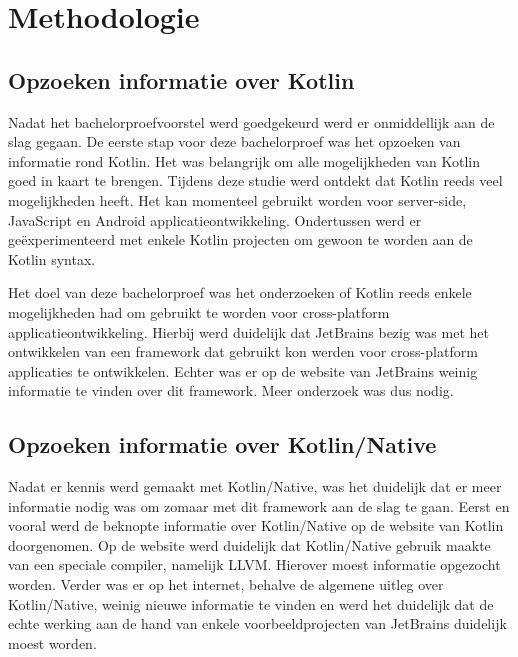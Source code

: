 
\chapter{Methodologie}
\label{ch:methodologie}


\section{Opzoeken informatie over Kotlin}
Nadat het bachelorproefvoorstel werd goedgekeurd werd er onmiddellijk aan de slag gegaan. De eerste stap voor deze bachelorproef was het opzoeken van informatie rond Kotlin. Het was belangrijk om alle mogelijkheden van Kotlin goed in kaart te brengen. Tijdens deze studie werd ontdekt dat Kotlin reeds veel mogelijkheden heeft. Het kan momenteel gebruikt worden voor server-side, JavaScript en Android applicatieontwikkeling. Ondertussen werd er geëxperimenteerd met enkele Kotlin projecten om gewoon te worden aan de Kotlin syntax.

Het doel van deze bachelorproef was het onderzoeken of Kotlin reeds enkele mogelijkheden had om gebruikt te worden voor cross-platform applicatieontwikkeling. Hierbij werd duidelijk dat JetBrains bezig was met het ontwikkelen van een framework dat gebruikt kon werden voor cross-platform applicaties te ontwikkelen. Echter was er op de website van JetBrains weinig informatie te vinden over dit framework. Meer onderzoek was dus nodig.

\section{Opzoeken informatie over Kotlin/Native}
\label{sec:infokn}
Nadat er kennis werd gemaakt met Kotlin/Native, was het duidelijk dat er meer informatie nodig was om zomaar met dit framework aan de slag te gaan. Eerst en vooral werd de beknopte informatie over Kotlin/Native op de website van Kotlin doorgenomen. Op de website werd duidelijk dat Kotlin/Native gebruik maakte van een speciale compiler, namelijk LLVM. Hierover moest informatie opgezocht worden. Verder was er op het internet, behalve de algemene uitleg over Kotlin/Native, weinig nieuwe informatie te vinden en werd het duidelijk dat de echte werking aan de hand van enkele voorbeeldprojecten van JetBrains duidelijk moest worden.

